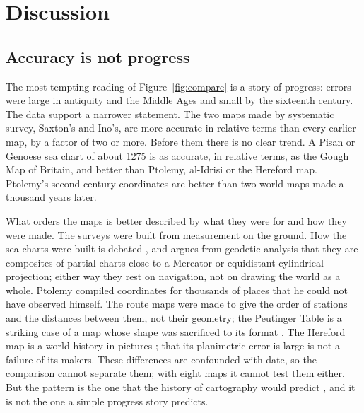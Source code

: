 \documentclass[11pt,a4paper]{article}
\begin{document}
\section{Discussion}\label{sec:disc}
\subsection{Accuracy is not progress}
The most tempting reading of Figure~\ref{fig:compare} is a story of progress: errors were large in antiquity and the Middle Ages and small by the sixteenth century. The data support a narrower statement. The two maps made by systematic survey, Saxton's and Ino's, are more accurate in relative terms than every earlier map, by a factor of two or more. Before them there is no clear trend. A Pisan or Genoese sea chart of about 1275 is as accurate, in relative terms, as the Gough Map of Britain, and better than Ptolemy, al-Idrisi or the Hereford map. Ptolemy's second-century coordinates are better than two world maps made a thousand years later.

What orders the maps is better described by what they were for and how they were made. The surveys were built from measurement on the ground. How the sea charts were built is debated \citep{campbell1987}, and \citet{nicolai2016} argues from geodetic analysis that they are composites of partial charts close to a Mercator or equidistant cylindrical projection; either way they rest on navigation, not on drawing the world as a whole. Ptolemy compiled coordinates for thousands of places that he could not have observed himself. The route maps were made to give the order of stations and the distances between them, not their geometry; the Peutinger Table is a striking case of a map whose shape was sacrificed to its format \citep{talbert2010}. The Hereford map is a world history in pictures \citep{woodward1985,harvey1996}; that its planimetric error is large is not a failure of its makers. These differences are confounded with date, so the comparison cannot separate them; with eight maps it cannot test them either. But the pattern is the one that the history of cartography would predict \citep{harley1987,edney2019}, and it is not the one a simple progress story predicts.
\end{document}
